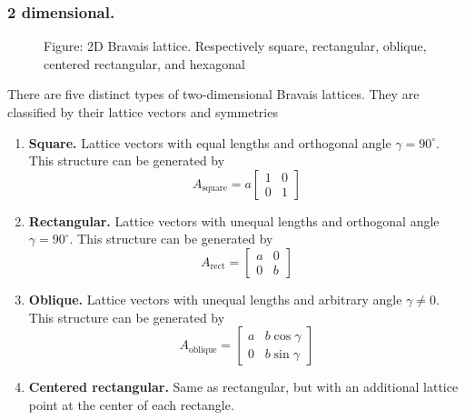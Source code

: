 \documentclass[../../../main.tex]{subfiles}
\begin{document}
\subsubsection{2 dimensional.}
\begin{figure}[h]
    \centering
    \caption*{Figure: 2D Bravais lattice. Respectively square, rectangular, oblique, centered rectangular, and hexagonal}
\end{figure}

There are five distinct types of two-dimensional Bravais lattices.
They are classified by their lattice vectors and symmetries
\begin{enumerate}
    \item \textbf{Square.} Lattice vectors with equal lengths and orthogonal angle $\gamma =90^\circ$.
          This structure can be generated by
          \begin{equation*}
              A_{\text{square}} = a
              \begin{bmatrix}
                  1 & 0 \\
                  0 & 1
              \end{bmatrix}
          \end{equation*}
    \item \textbf{Rectangular.} Lattice vectors with unequal lengths and orthogonal angle $\gamma =90^\circ$.
          This structure can be generated by
          \begin{equation*}
              A_{\text{rect}} =
              \begin{bmatrix}
                  a & 0 \\
                  0 & b
              \end{bmatrix}
          \end{equation*}
    \item \textbf{Oblique.} Lattice vectors with unequal lengths and arbitrary angle $\gamma \neq 0$.
          This structure can be generated by
          \begin{equation*}
              A_{\text{oblique}} =
              \begin{bmatrix}
                  a & b\cos\gamma \\
                  0 & b\sin\gamma
              \end{bmatrix}
          \end{equation*}
    \item \textbf{Centered rectangular.} Same as rectangular, but with an additional lattice point at the center of each rectangle.

\end{enumerate}
\end{document}

